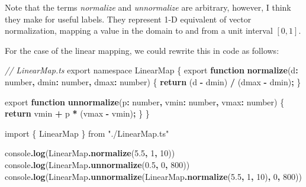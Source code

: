 \documentclass[
]{book}
\newenvironment{Shaded}{\begin{snugshade}}{\end{snugshade}}
\newcommand{\BuiltInTok}[1]{#1}
\newcommand{\CommentTok}[1]{\textcolor[rgb]{0.56,0.35,0.01}{\textit{#1}}}
\newcommand{\ControlFlowTok}[1]{\textcolor[rgb]{0.13,0.29,0.53}{\textbf{#1}}}
\newcommand{\DataTypeTok}[1]{\textcolor[rgb]{0.13,0.29,0.53}{#1}}
\newcommand{\DecValTok}[1]{\textcolor[rgb]{0.00,0.00,0.81}{#1}}
\newcommand{\FloatTok}[1]{\textcolor[rgb]{0.00,0.00,0.81}{#1}}
\newcommand{\FunctionTok}[1]{\textcolor[rgb]{0.13,0.29,0.53}{\textbf{#1}}}
\newcommand{\ImportTok}[1]{#1}
\newcommand{\KeywordTok}[1]{\textcolor[rgb]{0.13,0.29,0.53}{\textbf{#1}}}
\newcommand{\NormalTok}[1]{#1}
\newcommand{\OperatorTok}[1]{\textcolor[rgb]{0.81,0.36,0.00}{\textbf{#1}}}
\newcommand{\StringTok}[1]{\textcolor[rgb]{0.31,0.60,0.02}{#1}}
\theoremstyle{definition}
\theoremstyle{definition}
\theoremstyle{definition}
\theoremstyle{definition}
\theoremstyle{remark}
\begin{document}
Note that the terms \emph{normalize} and \emph{unnormalize} are arbitrary, however, I think they make for useful labels. They represent 1-D equivalent of vector normalization, mapping a value in the domain to and from a unit interval \([0, 1]\).

For the case of the linear mapping, we could rewrite this in code as follows:

\begin{Shaded}
\begin{Highlighting}[]
\CommentTok{// LinearMap.ts}
\ImportTok{export} \ImportTok{namespace} \DataTypeTok{LinearMap}\NormalTok{ \{}
  \ImportTok{export} \KeywordTok{function} \FunctionTok{normalize}\NormalTok{(d}\OperatorTok{:} \DataTypeTok{number}\OperatorTok{,}\NormalTok{ dmin}\OperatorTok{:} \DataTypeTok{number}\OperatorTok{,}\NormalTok{ dmax}\OperatorTok{:} \DataTypeTok{number}\NormalTok{) \{}
    \ControlFlowTok{return}\NormalTok{ (d }\OperatorTok{{-}}\NormalTok{ dmin) }\OperatorTok{/}\NormalTok{ (dmax }\OperatorTok{{-}}\NormalTok{ dmin)}\OperatorTok{;}
\NormalTok{  \}}

  \ImportTok{export} \KeywordTok{function} \FunctionTok{unnormalize}\NormalTok{(p}\OperatorTok{:} \DataTypeTok{number}\OperatorTok{,}\NormalTok{ vmin}\OperatorTok{:} \DataTypeTok{number}\OperatorTok{,}\NormalTok{ vmax}\OperatorTok{:} \DataTypeTok{number}\NormalTok{) \{}
    \ControlFlowTok{return}\NormalTok{ vmin }\OperatorTok{+}\NormalTok{ p }\OperatorTok{*}\NormalTok{ (vmax }\OperatorTok{{-}}\NormalTok{ vmin)}\OperatorTok{;}
\NormalTok{  \}}
\NormalTok{\}}
\end{Highlighting}
\end{Shaded}

\begin{Shaded}
\begin{Highlighting}[]
\ImportTok{import}\NormalTok{ \{ LinearMap \} }\ImportTok{from} \StringTok{"./LinearMap.ts"}

\BuiltInTok{console}\OperatorTok{.}\FunctionTok{log}\NormalTok{(LinearMap}\OperatorTok{.}\FunctionTok{normalize}\NormalTok{(}\FloatTok{5.5}\OperatorTok{,} \DecValTok{1}\OperatorTok{,} \DecValTok{10}\NormalTok{))}
\BuiltInTok{console}\OperatorTok{.}\FunctionTok{log}\NormalTok{(LinearMap}\OperatorTok{.}\FunctionTok{unnormalize}\NormalTok{(}\FloatTok{0.5}\OperatorTok{,} \DecValTok{0}\OperatorTok{,} \DecValTok{800}\NormalTok{))}
\BuiltInTok{console}\OperatorTok{.}\FunctionTok{log}\NormalTok{(LinearMap}\OperatorTok{.}\FunctionTok{unnormalize}\NormalTok{(LinearMap}\OperatorTok{.}\FunctionTok{normalize}\NormalTok{(}\FloatTok{5.5}\OperatorTok{,} \DecValTok{1}\OperatorTok{,} \DecValTok{10}\NormalTok{)}\OperatorTok{,} \DecValTok{0}\OperatorTok{,} \DecValTok{800}\NormalTok{))}
\end{Highlighting}
\end{Shaded}
\end{document}
